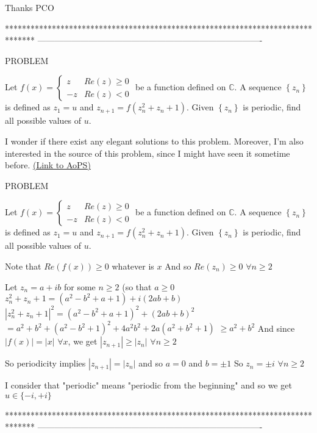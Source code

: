 \begin{solution}
	Thanks PCO
\end{solution}
*******************************************************************************
-------------------------------------------------------------------------------

\begin{problem}
	\begin{bolded}PROBLEM\end{bolded}  Let $f \left( x \right) = \begin{cases} z& {Re(z) \ge 0}\\ -z& {Re(z) < 0} \end{cases}$ be a function defined on $\mathbb{C}$. A sequence $\left \{ z_{n} \right \}$ is defined as $z_{1} = u$ and $z_{n+1} = f \left( z_{n}^2+z_{n}+1 \right)$. Given $\left \{ z_{n} \right \}$ is periodic, find all possible values of $u$.

I wonder if there exist any elegant solutions to this problem. Moreover, I'm also interested in the source of this problem, since I might have seen it sometime before.
	\flushright \href{https://artofproblemsolving.com/community/c6h1621856}{(Link to AoPS)}
\end{problem}



\begin{solution}
	\begin{tcolorbox}\begin{bolded}PROBLEM\end{bolded}  Let $f \left( x \right) = \begin{cases} z& {Re(z) \ge 0}\\ -z& {Re(z) < 0} \end{cases}$ be a function defined on $\mathbb{C}$. A sequence $\left \{ z_{n} \right \}$ is defined as $z_{1} = u$ and $z_{n+1} = f \left( z_{n}^2+z_{n}+1 \right)$. Given $\left \{ z_{n} \right \}$ is periodic, find all possible values of $u$.\end{tcolorbox}
Note that $Re(f(x))\ge 0$ whatever is $x$
And so $Re(z_n)\ge 0$ $\forall n\ge 2$

Let $z_n=a+ib$ for some $n\ge 2$ (so that $a\ge 0$
$z_n^2+z_n+1=(a^2-b^2+a+1)+i(2ab+b)$
$|z_n^2+z_n+1|^2=(a^2-b^2+a+1)^2+(2ab+b)^2$
$=a^2+b^2+(a^2-b^2+1)^2+4a^2b^2+2a(a^2+b^2+1)$ $\ge a^2+b^2$
And since $|f(x)|=|x|$ $\forall x$, we get $|z_{n+1}|\ge |z_n|$ $\forall n\ge 2$

So periodicity implies $|z_{n+1}|= |z_n|$ and so $a=0$ and $b=\pm 1$
So $z_n=\pm i$ $\forall n\ge 2$

I consider that "periodic" means "periodic from the beginning" and so we get 
$\boxed{u\in\{-i,+i\}}$




\end{solution}
*******************************************************************************
-------------------------------------------------------------------------------

